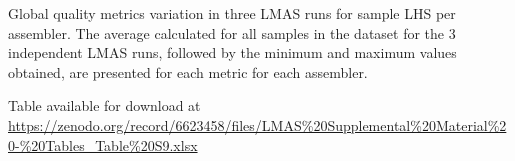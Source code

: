 \begin{table}[]
\centering
\caption{Global quality metrics variation in three LMAS runs for sample LHS per assembler. The average calculated for all samples in the dataset for the 3 independent LMAS runs, followed by the minimum and maximum values obtained, are presented for each metric for each assembler.}
\label{tab:ch5_suptable9}
Table available for download at \url{https://zenodo.org/record/6623458/files/LMAS\%20Supplemental\%20Material\%20-\%20Tables_Table\%20S9.xlsx}
\end{table}